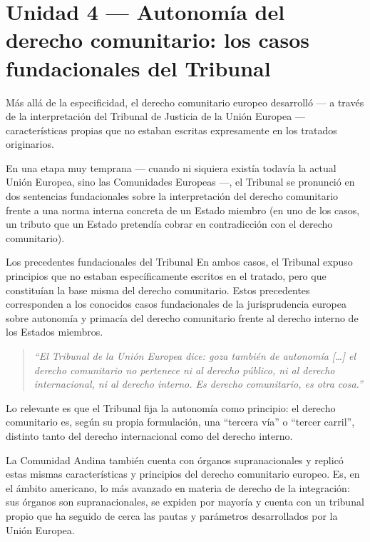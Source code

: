 \documentclass[12pt,oneside]{book}
\begin{document}
\section{Unidad 4 --- Autonomía del derecho comunitario: los casos fundacionales del Tribunal}

Más allá de la especificidad, el derecho comunitario europeo desarrolló --- a través de la interpretación del Tribunal de Justicia de la Unión Europea --- características propias que no estaban escritas expresamente en los tratados originarios.

En una etapa muy temprana --- cuando ni siquiera existía todavía la actual Unión Europea, sino las Comunidades Europeas ---, el Tribunal se pronunció en dos sentencias fundacionales sobre la interpretación del derecho comunitario frente a una norma interna concreta de un Estado miembro (en uno de los casos, un tributo que un Estado pretendía cobrar en contradicción con el derecho comunitario).

\begin{example}{Los precedentes fundacionales del Tribunal}
En ambos casos, el Tribunal expuso principios que no estaban específicamente escritos en el tratado, pero que constituían la base misma del derecho comunitario. Estos precedentes corresponden a los conocidos casos fundacionales de la jurisprudencia europea sobre autonomía y primacía del derecho comunitario frente al derecho interno de los Estados miembros.
\end{example}

\begin{quote}
\itshape ``El Tribunal de la Unión Europea dice: goza también de autonomía [\ldots] el derecho comunitario no pertenece ni al derecho público, ni al derecho internacional, ni al derecho interno. Es derecho comunitario, es otra cosa.''
\end{quote}


Lo relevante es que el Tribunal fija la autonomía como principio: el derecho comunitario es, según su propia formulación, una ``tercera vía'' o ``tercer carril'', distinto tanto del derecho internacional como del derecho interno.

\begin{note}
La Comunidad Andina también cuenta con órganos supranacionales y replicó estas mismas características y principios del derecho comunitario europeo. Es, en el ámbito americano, lo más avanzado en materia de derecho de la integración: sus órganos son supranacionales, se expiden por mayoría y cuenta con un tribunal propio que ha seguido de cerca las pautas y parámetros desarrollados por la Unión Europea.
\end{note}
\end{document}
